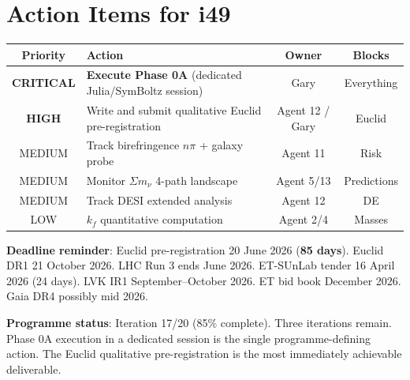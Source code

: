 \documentclass[11pt,a4paper]{article}
\begin{document}
\part{Action Items for i49}

\begin{center}
\begin{tabular}{clcc}
\toprule
\textbf{Priority} & \textbf{Action} & \textbf{Owner} & \textbf{Blocks} \\
\midrule
\textbf{CRITICAL} & \textbf{Execute Phase 0A} (dedicated Julia/SymBoltz session) & Gary & Everything \\
\textbf{HIGH} & Write and submit qualitative Euclid pre-registration & Agent 12 / Gary & Euclid \\
MEDIUM & Track birefringence $n\pi$ + galaxy probe & Agent 11 & Risk \\
MEDIUM & Monitor $\Sigma m_\nu$ 4-path landscape & Agent 5/13 & Predictions \\
MEDIUM & Track DESI extended analysis & Agent 12 & DE \\
LOW & $k_f$ quantitative computation & Agent 2/4 & Masses \\
\bottomrule
\end{tabular}
\end{center}

\textbf{Deadline reminder}: Euclid pre-registration 20 June 2026 (\textbf{85 days}). Euclid DR1 21 October 2026. LHC Run 3 ends June 2026. ET-SUnLab tender 16 April 2026 (24 days). LVK IR1 September--October 2026. ET bid book December 2026. Gaia DR4 possibly mid 2026.

\textbf{Programme status}: Iteration 17/20 (85\% complete). Three iterations remain. Phase 0A execution in a dedicated session is the single programme-defining action. The Euclid qualitative pre-registration is the most immediately achievable deliverable.
\end{document}
